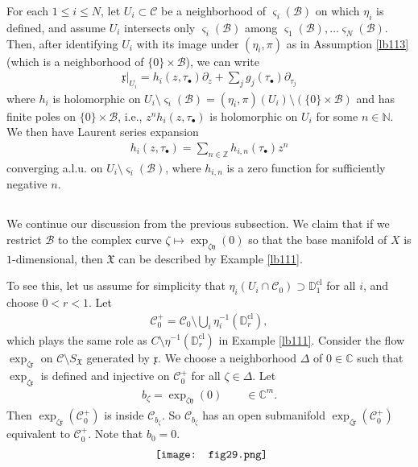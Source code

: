 \documentclass[11pt,b5paper,notitlepage]{article}
\theoremstyle{definition}
\theoremstyle{plain}
\newcommand{\fk}{\mathfrak}
\newcommand{\mc}{\mathcal}
\newcommand{\xk}{\mathfrak x}
\newcommand{\yk}{\mathfrak y}
\newcommand{\sgm}{\varsigma}
\newcommand{\SX}{{S_{\fk X}}}
\newcommand{\blt}{\bullet}
\newcommand{\Cbb}{\mathbb C}
\newcommand{\Nbb}{\mathbb N}
\newcommand{\Zbb}{\mathbb Z}
\newcommand{\Dbb}{\mathbb D}
\newcommand{\cl}{\mathrm{cl}}
\numberwithin{equation}{section}
\begin{document}
For each $1\leq i\leq N$, let $U_i\subset\mc C$ be a neighborhood of $\sgm_i(\mc B)$ on which $\eta_i$ is defined, and assume $U_i$ intersects only $\sgm_i(\mc B)$ among $\sgm_1(\mc B),\dots\sgm_N(\mc B)$. Then, after identifying $U_i$ with its image under $(\eta_i,\pi)$ as in Assumption \ref{lb113} (which is a neighborhood of $\{0\}\times\mc B$), we can write
\begin{align}
\xk|_{U_i}=h_i(z,\tau_\blt)\partial_z+\sum_j g_j(\tau_\blt)\partial_{\tau_j}\label{eq213}
\end{align}
where $h_i$ is holomorphic on $U_i\setminus\sgm_i(\mc B)=(\eta_i,\pi)(U_i)\setminus(\{0\}\times\mc B)$ and has finite poles on  $\{0\}\times\mc B$, i.e., $z^nh_i(z,\tau_\blt)$ is holomorphic on $U_i$ for some $n\in\Nbb$. We then have Laurent series expansion
\begin{align}
h_i(z,\tau_\blt)=\sum_{n\in\Zbb}h_{i,n}(\tau_\blt)z^n\label{eq214}
\end{align}
converging a.l.u. on $U_i\setminus\sgm_i(\mc B)$, where $h_{i,n}$ is a zero function for sufficiently negative $n$.


\subsection{}

We continue our discussion from the previous subsection. We claim that if we restrict $\mc B$ to the complex curve $\zeta\mapsto \exp_{\zeta\yk}(0)$ so that the base manifold of $X$ is $1$-dimensional, then $\fk X$ can be described by Example \ref{lb111}. 

To see this, let us assume for simplicity that $\eta_i(U_i\cap\mc C_0)\supset \Dbb_1^\cl$ for all $i$, and choose $0<r<1$. Let
\begin{align*}
\mc C_0^+=\mc C_0\setminus\bigcup_i \eta_i^{-1}(\Dbb_r^\cl),
\end{align*}
which plays the same role as $C\setminus\eta^{-1}(\Dbb_r^\cl)$ in Example \ref{lb111}. Consider the flow $\exp_{\zeta\xk}$ on $\mc C\setminus\SX$ generated by $\xk$. We choose a neighborhood $\Delta$ of $0\in\Cbb$ such that  $\exp_{\zeta\xk}$ is defined and injective on $\mc C_0^+$ for all $\zeta\in\Delta$. Let 
\begin{align*}
b_\zeta=\exp_{\zeta\yk}(0)\qquad\in\Cbb^m.
\end{align*}
Then $\exp_{\zeta\xk}(\mc C_0^+)$ is inside $\mc C_{b_\zeta}$. So $\mc C_{b_\zeta}$ has an open submanifold $\exp_{\zeta\xk}(\mc C_0^+)$ equivalent to $\mc C_0^+$. Note that $b_0=0$.
\begin{align}\label{eq237}
\vcenter{\hbox{{
\texttt{[image: fig29.png]}}}}
\end{align}
\end{document}

